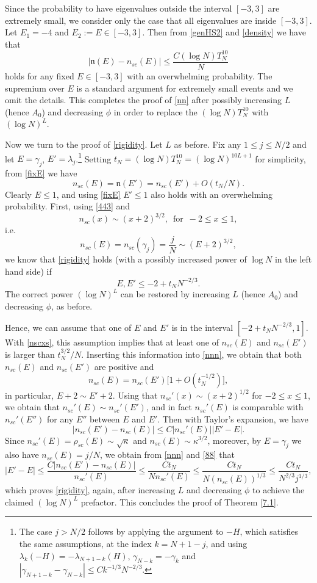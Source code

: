 \documentclass[draft]{article}
\newcommand{\fn}{{\mathfrak n}}
\newcommand{\be}{\begin{equation}}
\newcommand{\ee}{\end{equation}}
\numberwithin{equation}{section}
\numberwithin{theorem}{section}
\numberwithin{definition}{section}
\numberwithin{remark}{section}
\begin{document}
Since the probability to have eigenvalues outside the interval $[-3, 3]$ are
 extremely small, we consider only the case 
that all eigenvalues are inside $[-3, 3]$. Let $E_1= -4$ and $E_2:=E \in [-3,3]$. Then 
from \eqref{genHS2}  and \eqref{density} we have that
\be
   \Big| {\mathfrak n}(E) - n_{sc}(E)\Big|
  \le \frac{C (\log N)T_N^{10} }{N}
\label{fixE}
\ee
holds for any fixed $E\in [-3,3]$ with an overwhelming probability. 
The supremium over $E $ is a standard argument for 
extremely small events and we omit the details.  
This completes the proof of \eqref{nn} after possibly increasing $L$ (hence $A_0$)
 and decreasing $\phi$ in order to replace the $(\log N)T_N^{10}$ with $(\log N)^L$.

\medskip

Now we turn to the proof of \eqref{rigidity}. Let $L$ as before.
Fix any $ 1\le j \le N/2 $ and let $E = \gamma_j$, $E'= \lambda_j$.\footnote{The case $j>N/2$
follows by applying the argument to $-H$, which satisfies the same assumptions, at the index
$k=N+1-j$, and using $\lambda_k(-H)=-\lambda_{N+1-k}(H)$, $\gamma_{N-k}=-\gamma_k$ and
$|\gamma_{N+1-k}-\gamma_{N-k}|\le C k^{-1/3}N^{-2/3}$.}
Setting $t_N=(\log N)T_N^{10}=(\log N)^{10L+1}$ for simplicity, from \eqref{fixE}  we have 
\be
n_{sc}(E) = \fn(E') = n_{sc}(E') + O(t_N/N). 
\label{nnn}
\ee
Clearly $E\le 1$, and using \eqref{fixE} $E'\le 1$ also holds with an overwhelming
probability.
First, using \eqref{443} and 
\be\label{nscxs}
n_{sc}(x) \sim (x+2)^{3/2},
\,\,\,\mbox{for}\,\,\,-2\leq x\leq1, 
\ee 
i.e. 
$$
  n_{sc}(E)=n_{sc}(\gamma_j) = \frac{j}{N} \sim (E +2)^{3/2},
$$
we know that \eqref{rigidity} holds  (with a possibly increased power of $\log N$
in the left hand side)
 if 
\be
E,E'\leq -2+t_N N^{-2/3}.
\ee
The correct power $(\log N)^L$ can be restored by increasing $L$ (hence $A_0$)
and decreasing $\phi$, as before.


Hence, we can assume that one of $E$ and $E'$ is 
in the interval $[-2+t_N N^{-2/3},1]$. With  \eqref{nscxs}, this assumption implies that
at least one of
 $n_{sc}(E)$ and $n_{sc}(E')$ is larger than $t_N^{3/2}/ N$. 
 Inserting this information into \eqref{nnn}, we obtain that both  $n_{sc}(E)$ and $n_{sc}(E')$
are positive and 
$$ 
   n_{sc}(E) = n_{sc}(E') \big[ 1 + O(t_N^{-1/2})\big],
$$
in particular, $E+2\sim E'+2$. Using that $n_{sc}'(x)\sim (x+2)^{1/2}$ for $-2\le x\le 1$,
we obtain that $n_{sc}'(E) \sim n_{sc}'(E')$, and in fact $n_{sc}'(E)$ is
comparable with $n_{sc}'(E'')$ for any $E''$ between $E$ and $E'$.
Then with Taylor's expansion, we have 
\be\label{88}
|n_{sc}(E')-n_{sc}(E)|\le C |n_{sc}'(E)| |E'-E| .
\ee
Since $n_{sc}'(E) = \rho_{sc}(E) \sim \sqrt \kappa$ and $n_{sc}(E) \sim \kappa^{3/2}$,
moreover, by $E=\gamma_j$ we also have $n_{sc}(E) =j/N$,
 we obtain
from \eqref{nnn} and \eqref{88} that
\[
|E'-E| \le \frac{C|  n_{sc}(E')- n_{sc}(E)|}{n_{sc}'(E)}\le
 \frac {Ct_N} { N n_{sc}'(E) }   \le  \frac {C t_N} { N (n_{sc}(E))^{1/3} }
  \le \frac {C t_N} { N^{2/3}  j^{1/3} },
\]
which proves \eqref{rigidity}, 
again, after increasing $L$ and decreasing $\phi$ to achieve the claimed
 $(\log N)^L$ prefactor.
 This concludes the proof of Theorem \ref{7.1}.
\end{document}
